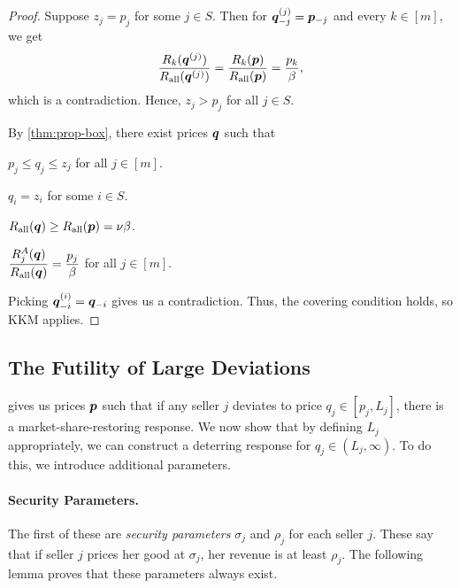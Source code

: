 \begin{proof}
Suppose $z_j = p_j$ for some $j \in S$. Then for $\bm{q}^{(j)}_{-j} = \bm{p}_{-j}$ and every $k \in [m]$, we get
\[ \frac{R_k(\bm{q}^{(j)})}{R_{\operatorname{all}}(\bm{q}^{(j)})} = \frac{R_k(\bm{p})}{R_{\operatorname{all}}(\bm{p})} = \frac{p_k}{\beta}, \]
which is a contradiction. Hence, $z_j > p_j$ for all $j \in S$.

By \cref{thm:prop-box}, there exist prices $\bm{q}$ such that
\begin{tightenum}
\item $p_j \le q_j \le z_j$ for all $j \in [m]$.
\item $q_i = z_i$ for some $i \in S$.
\item $R_{\operatorname{all}}(\bm{q}) \ge R_{\operatorname{all}}(\bm{p}) = \nu\beta$.
\item $\displaystyle \frac{R^A_j(\bm{q})}{R_{\operatorname{all}}(\bm{q})} = \frac{p_j}{\beta}$ for all $j \in [m]$.
\end{tightenum}
Picking $\bm{q}^{(i)}_{-i} = \bm{q}_{-i}$ gives us a contradiction.
Thus, the covering condition holds, so KKM applies.
\end{proof}

\subsection{The Futility of Large Deviations}
\label{sec:exist:overpricing}

 gives us prices $\bm{p}$ such that
if any seller $j$ deviates to price $q_j \in [p_j, L_j]$,
there is a market-share-restoring response.
We now show that by defining $L_j$ appropriately,
we can construct a deterring response for $q_j \in (L_j, \infty)$.
To do this, we introduce additional parameters.

\paragraph{Security Parameters.}
The first of these are \emph{security parameters} $\sigma_j$ and $\rho_j$ for each seller $j$.
These say that if seller $j$ prices her good at $\sigma_j$, her revenue is at least $\rho_j$.
The following lemma proves that these parameters always exist.

